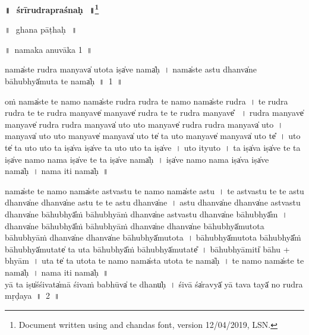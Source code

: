 \documentclass[parskip, DIV=14]{scrartcl}
\renewcommand{\thefootnote}{\fnsymbol{footnote}} %
\begin{document}

\vspace{-1.5cm}

\begin{center}
\textbf{{\Huge॥\,~śrīrudrapraśnaḥ\,~॥\LARGE\let\thefootnote\relax\footnote{\color{lightgray} Document written using \XeLaTeX{} and chandas font,  version 12/04/2019, LSN.}}}
\end{center}
\Large

{\centering	

\LARGE
॥\,~ghana pāṭhaḥ\,~॥\\
\vspace{0.5cm}

॥~namaka anuvāka 1~॥ 
\Large

nama̍ste rudra ma॒nyava̍ u॒tota॒ iṣa̍ve॒ nama̍ḥ~।
nama̍ste astu॒ dhanva̍ne bā॒hubhyā̍mu॒ta te॒ nama̍ḥ~॥~1~॥

oṁ nama̍ste te॒ namo॒ nama̍ste rudra rudra te॒ namo॒ nama̍ste rudra~।
te॒ ru॒dra॒ ru॒dra॒ te॒ te॒ ru॒dra॒ ma॒nyave̍ ma॒nyave̍ rudra te te rudra ma॒nyave̎ ~।
ru॒dra॒ ma॒nyave̍ ma॒nyave̍ rudra rudra ma॒nyava̍ u॒to u॒to ma॒nyave̍ rudra rudra ma॒nyava̍ u॒to~।
ma॒nyava̍ u॒to u॒to  ma॒nyave̍ ma॒nyava̍ u॒to te̍ ta u॒to ma॒nyave̍ ma॒nyava̍ u॒to te̎~।
u॒to te̍ ta u॒to u॒to ta॒ iṣa̍va॒ iṣa̍ve ta u॒to u॒to ta॒ iṣa̍ve~।
u॒to ityu॒to~।
ta॒ iṣa̍va॒ iṣa̍ve te ta॒  iṣa̍ve॒ namo॒ nama॒ iṣa̍ve te ta॒  iṣa̍ve॒ nama̍ḥ~।
iṣa̍ve॒ namo॒ nama॒ iṣa̍va॒ iṣa̍ve॒ nama̍ḥ~।
nama॒ iti॒ nama̍ḥ~॥ 


nama̍ste te॒ namo॒ nama̍ste astvastu te॒ namo॒ nama̍ste astu~।
te॒ a॒stva॒stu॒ te॒ te॒ a॒stu॒ dhanva̍ne॒ dhanva̍ne astu te te astu॒ dhanva̍ne~।
a॒stu॒ dhanva̍ne॒ dhanva̍ne astvastu॒ dhanva̍ne bā॒hubhyā̎ṁ bā॒hubhyā॒ṁ dhanva̍ne astvastu॒ dhanva̍ne bā॒hubhyā̎m~।
dhanva̍ne bā॒hubhyā̎ṁ bā॒hubhyā॒ṁ dhanva̍ne॒ dhanva̍ne bā॒hubhyā̍mu॒tota bā॒hubhyā॒ṁ dhanva̍ne॒ dhanva̍ne bā॒hubhyā̍mu॒tota~।
bā॒hubhyā̍mu॒tota bā॒hubhyā̎ṁ bā॒hubhyā̍mu॒tate̍ ta u॒ta bā॒hubhyā̎ṁ bā॒hubhyā̍mu॒tate̎~।
bā॒hubhyā॒miti̍ bā॒hu + bhyā॒m~।
u॒ta te̍ ta u॒tota te॒ namo॒ nama̍sta u॒tota te॒ nama̍ḥ~।
te॒ namo॒ nama̍ste te॒ nama̍ḥ~। 
nama॒ iti॒ nama̍ḥ~॥ \\

\vspace{0.5cm}
yā ta॒ iṣu̍śśi॒vata̍mā śi॒vaṁ ba॒bhūva̍ te॒ dhanu̍ḥ~।
śi॒vā śa̍ra॒vyā̍ yā tava॒ tayā̍ no rudra mṛḍaya~॥~2~॥

}
\end{document}
